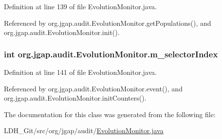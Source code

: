 Definition at line 139 of file Evolution\-Monitor.\-java.



Referenced by org.\-jgap.\-audit.\-Evolution\-Monitor.\-get\-Populations(), and org.\-jgap.\-audit.\-Evolution\-Monitor.\-init().

\hypertarget{classorg_1_1jgap_1_1audit_1_1_evolution_monitor_af91128db503b0f3dfe34e59840ba7b8a}{
\subsubsection[{m\-\_\-selector\-Index}]{\setlength{\rightskip}{0pt plus 5cm}int org.\-jgap.\-audit.\-Evolution\-Monitor.\-m\-\_\-selector\-Index\hspace{0.3cm}{\ttfamily [private]}}}\label{classorg_1_1jgap_1_1audit_1_1_evolution_monitor_af91128db503b0f3dfe34e59840ba7b8a}


Definition at line 141 of file Evolution\-Monitor.\-java.



Referenced by org.\-jgap.\-audit.\-Evolution\-Monitor.\-event(), and org.\-jgap.\-audit.\-Evolution\-Monitor.\-init\-Counters().



The documentation for this class was generated from the following file\-:\begin{DoxyCompactItemize}
\item 
L\-D\-H\-\_\-\-Git/src/org/jgap/audit/\hyperlink{_evolution_monitor_8java}{Evolution\-Monitor.\-java}\end{DoxyCompactItemize}
